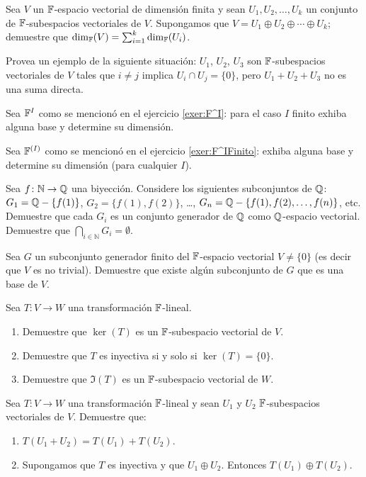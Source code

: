 \begin{exerciselist}
  \item Sea $V$ un $\mathbb{F}$-espacio vectorial de dimensión finita y sean $U_1, U_2, \ldots, U_k$ un conjunto de $\mathbb{F}$-subespacios vectoriales de $V$. Supongamos que $V = U_1 \oplus U_2 \oplus \cdots \oplus U_k$; demuestre que $\dim_{\mathbb{F}}(V) = \sum _{i=1}^k \dim_{\mathbb{F}}(U_i)$.
  
  \item Provea un ejemplo de la siguiente situación: $U_1$, $U_2$, $U_3$ son $\mathbb{F}$-subespacios vectoriales de $V$ tales que $i \neq j$ implica $U_i \cap U_j = \{0\}$, pero $U_1 + U_2 + U_3$ no es una suma directa.
  
  \item Sea $\mathbb{F}^I$ como se mencionó en el ejercicio \ref{exer:F^I}: para el caso $I$ finito exhiba alguna base y determine su dimensión.
  
  \item Sea $\mathbb{F}^{(I)}$ como se mencionó en el ejercicio \ref{exer:F^IFinito}: exhiba alguna base y determine su dimensión (para cualquier $I$).
  
  \item Sea $f \colon \mathbb{N} \to \mathbb{Q}$ una biyección. Considere los siguientes subconjuntos de $\mathbb{Q}$: $G_1 = \mathbb{Q} - \{ f(1)\}$, $G_2 = \{ f(1), f(2) \}$, \dots, $G_n = \mathbb{Q} - \{ f(1), f(2), \ldots, f(n) \}$, etc. Demuestre que cada $G_i$ es un conjunto generador de $\mathbb{Q}$ como $\mathbb{Q}$-espacio vectorial. Demuestre que $\bigcap _{i \in \mathbb{N}} G_i = \emptyset$.
  
  \item Sea $G$ un subconjunto generador finito del $\mathbb{F}$-espacio vectorial $V \neq \{0\}$ (es decir que $V$ es no trivial). Demuestre que existe algún subconjunto de $G$ que es una base de $V$.
  
  \item Sea $T\colon V \to W$ una transformación $\mathbb{F}$-lineal.
    \begin{enumerate}
      \item Demuestre que $\ker(T)$ es un $\mathbb{F}$-subespacio vectorial de $V$.
      \item Demuestre que $T$ es inyectiva si y solo si $\ker(T) = \{0\}$.
      \item Demuestre que $\Im(T)$ es un $\mathbb{F}$-subespacio vectorial de $W$.
    \end{enumerate}

  \item Sea $T\colon V \to W$ una transformación $\mathbb{F}$-lineal y sean $U_1$ y $U_2$ $\mathbb{F}$-subespacios vectoriales de $V$. Demuestre que:
    \begin{enumerate}
      \item $T(U_1 + U_2) = T(U_1) + T(U_2)$.
      \item Supongamos que $T$ es inyectiva y que $U_1 \oplus U_2$. Entonces $T(U_1) \oplus T(U_2)$.
    \end{enumerate}


\end{exerciselist}
